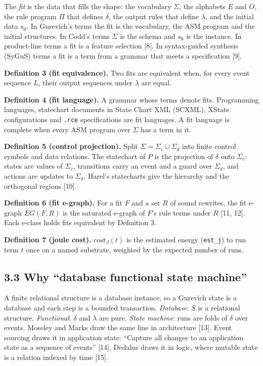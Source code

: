 \documentclass[10pt,letterpaper]{article}
\begin{document}
The \emph{fit} is the data that fills the shape: the vocabulary
\(\Sigma\), the alphabets \(E\) and \(O\), the rule program \(\Pi\) that
defines \(\delta\), the output rules that define \(\lambda\), and the
initial data \(s_0\). In Gurevich's terms the fit is the vocabulary, the
ASM program and the initial structures. In Codd's terms \(\Sigma\) is
the schema and \(s_0\) is the instance. In product-line terms a fit is a
feature selection {[}8{]}. In syntax-guided synthesis (SyGuS) terms a
fit is a term from a grammar that meets a specification {[}9{]}.

\textbf{Definition 3 (fit equivalence).} Two fits are equivalent when,
for every event sequence \(L\), their output sequences under \(\lambda\)
are equal.

\textbf{Definition 4 (fit language).} A grammar whose terms denote fits.
Programming languages, statechart documents in State Chart XML (SCXML),
XState configurations and \texttt{.rce} specifications are fit
languages. A fit language is complete when every ASM program over
\(\Sigma\) has a term in it.

\textbf{Definition 5 (control projection).} Split
\(\Sigma = \Sigma_c \cup \Sigma_d\) into finite control symbols and data
relations. The statechart of \(P\) is the projection of \(\delta\) onto
\(\Sigma_c\): states are values of \(\Sigma_c\), transitions carry an
event and a guard over \(\Sigma_d\), and actions are updates to
\(\Sigma_d\). Harel's statecharts give the hierarchy and the orthogonal
regions {[}10{]}.

\textbf{Definition 6 (fit e-graph).} For a fit \(F\) and a set \(R\) of
sound rewrites, the fit e-graph \(EG(F, R)\) is the saturated e-graph of
\(F\)'s rule terms under \(R\) {[}11, 12{]}. Each e-class holds fits
equivalent by Definition 3.

\textbf{Definition 7 (joule cost).} \(\mathrm{cost}_J(t)\) is the
estimated energy (\texttt{est\_j}) to run term \(t\) once on a named
substrate, weighted by the expected number of runs.

\subsection{3.3 Why ``database functional state
machine''}\label{why-database-functional-state-machine}

A finite relational structure is a database instance, so a Gurevich
state is a database and each step is a bounded transaction.
\emph{Database}: \(S\) is a relational structure. \emph{Functional}:
\(\delta\) and \(\lambda\) are pure. \emph{State machine}: runs are
folds of \(\delta\) over events. Moseley and Marks draw the same line in
architecture {[}13{]}. Event sourcing draws it in application state:
``Capture all changes to an application state as a sequence of events''
{[}14{]}. Dedalus draws it in logic, where mutable state is a relation
indexed by time {[}15{]}.
\end{document}
